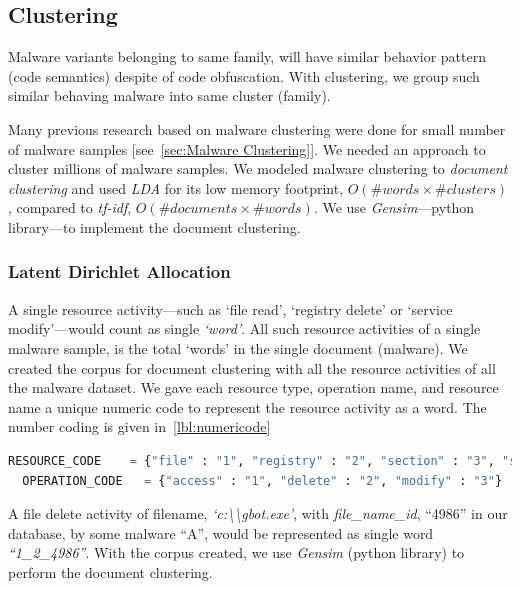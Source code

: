 \subsection{Clustering}
\label{sub:Clustering}
Malware variants belonging to same family, will have similar behavior pattern (code semantics) despite of code obfuscation.
With clustering, we group such similar behaving malware into same cluster (family).

Many previous research based on malware clustering were done for small number of malware samples [see~\autoref{sec:Malware Clustering}].
We needed an approach to cluster millions of malware samples.
We modeled malware clustering to \emph{document clustering} and used \emph{LDA} for its low memory footprint, $O(\#words\times \#clusters)$, compared to \emph{tf-idf}, $O(\#documents \times \#words)$.
We use \emph{Gensim}---python library---to implement the document clustering.
\subsubsection{Latent Dirichlet Allocation}
\label{ssub:Latent Dirichlet Allocation}
A single resource activity---such as `file read', `registry delete' or `service modify'---would count as single \emph{`word'}.
All such resource activities of a single malware sample, is the total `words' in the single document (malware).
We created the corpus for document clustering with all the resource activities of all the malware dataset.
We gave each resource type, operation name, and resource name a unique numeric code to represent the resource activity as a word.
The number coding is given in~\autoref{lbl:numericode}
\begin{lstlisting}[numbers=none,language=python,caption={Numeric codes given to resource and operation},label={lbl:numericode}]
  RESOURCE_CODE    = {"file" : "1", "registry" : "2", "section" : "3", "service" : "4", "driver" : "5", "sync" : "6", "process" : "7", "job" : "8"}
  OPERATION_CODE   = {"access" : "1", "delete" : "2", "modify" : "3"}
\end{lstlisting}

A file delete activity of filename, \textit{`c:\textbackslash\textbackslash{}gbot.exe'}, with \textit{file\_name\_id}, ``4986'' in our database, by some malware ``A'', would be represented as single word \emph{``1\_2\_4986''}.
With the corpus created, we use \emph{Gensim} (python library) to perform the document clustering.
